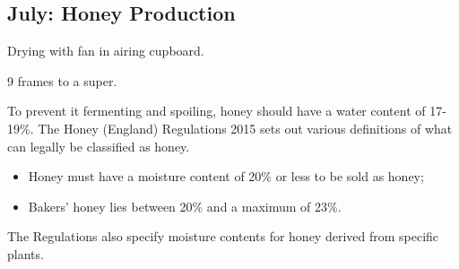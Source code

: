 \subsection{July: Honey Production}

Drying with fan in airing cupboard.

9 frames to a super.

To prevent it fermenting and spoiling, honey should have a water content of 17-19\%.
The Honey (England) Regulations 2015 sets out various definitions of what can legally be classified as honey.

\begin{itemize}
    \item Honey must have a moisture content of 20\% or less to be sold as honey;
    \item Bakers' honey lies between 20\% and a maximum of 23\%.
\end{itemize}

The Regulations also specify moisture contents for honey derived from specific plants.
